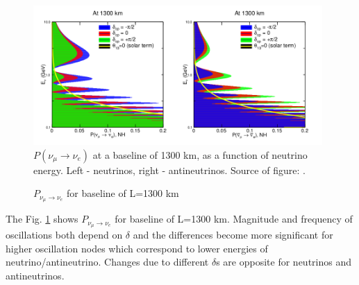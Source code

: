 \begin{figure}
\caption{$P_{\nu_\mu \rightarrow \nu_e}$ for baseline of L=1300 km}
\label{fig:LBNF_oscProbability}
\centering
\includegraphics[width=0.98\textwidth, keepaspectratio=true]{figs/LBNF_oscProbability.png}
\\$P(\nu_\mu \rightarrow \nu_e)$ at a baseline of 1300 km, as a function of neutrino energy. Left - neutrinos, right - antineutrinos. Source of figure: \cite{ref_LBNF_CDR}.
\end{figure}

The Fig. \ref{fig:LBNF_oscProbability} shows $P_{\nu_\mu \rightarrow \nu_e}$ for baseline of L=1300 km. Magnitude and frequency of oscillations both depend on $\delta$ and the differences become more significant for higher oscillation nodes which correspond to lower energies of neutrino/antineutrino. Changes due to different $\delta$s are opposite for neutrinos and antineutrinos.\\

